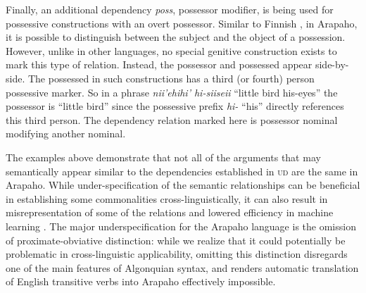 \documentclass[11pt]{article}
\begin{document}
Finally, an additional dependency \textit{poss}, possessor modifier, is being used for possessive constructions with an overt possessor. Similar to Finnish \cite{Tsarfaty2013,Haverinen2014}, in Arapaho, it is possible to distinguish between the subject and the object of a possession. However, unlike in other languages, no special genitive construction exists to mark this type of relation. Instead, the possessor and possessed appear side-by-side. The possessed in such constructions has a third (or fourth) person possessive marker. So in a phrase \textit{nii'ehihi' hi-siiseii} ``little bird his-eyes'' the possessor is ``little bird'' since the possessive prefix \textit{hi-} ``his'' directly references this third person. The dependency relation marked here is possessor nominal modifying another nominal. 

The examples above demonstrate that not all of the arguments that may semantically appear similar to the dependencies established in \textsc{ud} are the same in Arapaho. While under-specification of the semantic relationships can be beneficial in establishing some commonalities cross-linguistically, it can also result in misrepresentation of some of the relations and lowered efficiency in machine learning \cite{Lipenkova2014}. The major underspecification for the Arapaho language is the omission of proximate-obviative distinction: while we realize that it could potentially be problematic in cross-linguistic applicability, omitting this distinction disregards one of the main features of Algonquian syntax, and renders automatic translation of English transitive verbs into Arapaho effectively impossible.
\end{document}
